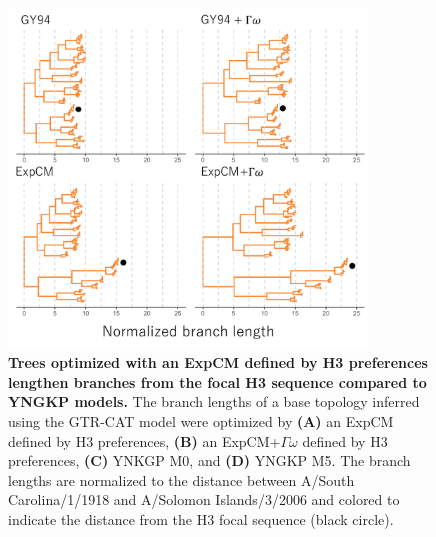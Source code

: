 \documentclass[11pt]{article}
\begin{document}
\begin{figure}
\centerline{\includegraphics[width=0.85\textwidth]{figures/tree_lee}}
\caption{\label{fig:tree_lee}
\textbf{Trees optimized with an ExpCM defined by H3 preferences lengthen branches from the focal H3 sequence compared to YNGKP models.} 
The branch lengths of a base topology inferred using the GTR-CAT model were optimized by \textbf{(A)} an ExpCM defined by H3 preferences, \textbf{(B)} an ExpCM+$\Gamma\omega$ defined by H3 preferences, \textbf{(C)} YNKGP M0, and \textbf{(D)} YNGKP M5.
The branch lengths are normalized to the distance between A/South Carolina/1/1918 and A/Solomon Islands/3/2006 and colored to indicate the distance from the H3 focal sequence (black circle).
}
\end{figure}
\end{document}
